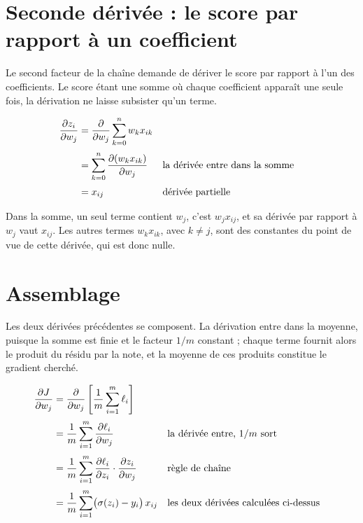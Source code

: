 \section{Seconde dérivée : le score par rapport à un coefficient}

Le second facteur de la chaîne demande de dériver le score par rapport à l'un des
coefficients. Le score étant une somme où chaque coefficient apparaît une seule
fois, la dérivation ne laisse subsister qu'un terme.

\begin{align}
  \frac{\partial z_i}{\partial w_j}
  &= \frac{\partial}{\partial w_j}\sum_{k=0}^{n}w_kx_{ik} \notag\\[2pt]
  &= \sum_{k=0}^{n}\frac{\partial (w_kx_{ik})}{\partial w_j}
    &&\text{la dérivée entre dans la somme} \notag\\[2pt]
  &= x_{ij}
    &&\text{dérivée partielle}
\end{align}

Dans la somme, un seul terme contient $w_j$, c'est $w_jx_{ij}$, et sa dérivée par
rapport à $w_j$ vaut $x_{ij}$. Les autres termes $w_kx_{ik}$, avec $k\neq j$, sont
des constantes du point de vue de cette dérivée, qui est donc nulle.

\section{Assemblage}

Les deux dérivées précédentes se composent. La dérivation entre dans la moyenne,
puisque la somme est finie et le facteur $1/m$ constant ; chaque terme fournit
alors le produit du résidu par la note, et la moyenne de ces produits constitue
le gradient cherché.

\begin{align}
  \frac{\partial J}{\partial w_j}
  &= \frac{\partial}{\partial w_j}\left[\frac{1}{m}\sum_{i=1}^{m}\ell_i\right] \notag\\[2pt]
  &= \frac{1}{m}\sum_{i=1}^{m}\frac{\partial \ell_i}{\partial w_j}
    &&\text{la dérivée entre, } 1/m \text{ sort} \notag\\[2pt]
  &= \frac{1}{m}\sum_{i=1}^{m}
     \frac{\partial \ell_i}{\partial z_i}\cdot\frac{\partial z_i}{\partial w_j}
    &&\text{règle de chaîne} \notag\\[2pt]
  &= \frac{1}{m}\sum_{i=1}^{m}\bigl(\sigma(z_i)-y_i\bigr)\,x_{ij}
    &&\text{les deux dérivées calculées ci-dessus}
\end{align}

